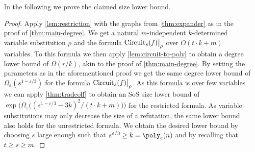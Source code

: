 \documentclass[10pt,a4paper]{article}
\theoremstyle{plain}
\theoremstyle{remark}
\theoremstyle{definition}
\newcommand{\eps}{\varepsilon}
\newcommand\restrict[2]{{%
  \left.\kern-\nulldelimiterspace %
  #1 %
  \vphantom{\big|} %
  \right|_{#2} %
  }}
\DeclareMathOperator{\circuit}{Circuit}
\begin{document}
In the following we prove the claimed size lower bound.

\MainSize*

\begin{proof}
  Apply \cref{lem:restriction} with the graphs from
  \cref{thm:expander} as in the proof of \cref{thm:main-degree}. We
  get a natural $m$-independent $k$-determined variable substitution
  $\rho$ and the formula $\restrict{\circuit_s(f)}{\rho}$ over
  $O(t \cdot k + m)$ variables.  To this formula we then apply
  \cref{lem:circuit-to-poly} to obtain a degree lower bound of
  $\Omega(r/k)$, akin to the proof of \cref{thm:main-degree}. By
  setting the parameters as in the aforementioned proof we get the
  same degree lower bound of $\Omega_\eps(s^{1-\eps/3})$ for the
  formula $\restrict{\circuit_s(f)}{\rho}$. As this formula is over
  few variables we can apply \cref{thm:tradeoff} to obtain an SoS size
  lower bound of
  $\exp \Big( \Omega_\eps\big((s^{1- \eps/3} - 3k)^2/(t \cdot k +
  m)\big) \Big)$ for the restricted formula. As variable substitutions
  may only decrease the size of a refutation, the same lower bound
  also holds for the unrestricted formula. We obtain the desired lower
  bound by choosing $s$ large enough such that
  $s^{\eps/3} \ge k = \poly_\eps(n)$ and by recalling that
  $t \ge s \ge m$. 
\end{proof}
\end{document}
